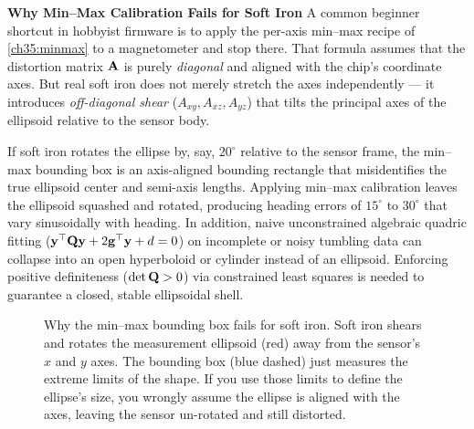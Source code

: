 \begin{trapbox}
\textbf{Why Min--Max Calibration Fails for Soft Iron}
A common beginner shortcut in hobbyist firmware is to apply the per-axis min--max
recipe of \eqref{ch35:minmax} to a magnetometer and stop there. That formula assumes that the distortion matrix $\mathbf{A}$ is purely \emph{diagonal} and aligned with the chip's coordinate axes. But real soft iron does not merely stretch the axes independently --- it introduces \emph{off-diagonal shear} ($A_{xy}, A_{xz}, A_{yz}$) that tilts the principal axes of the ellipsoid relative to the sensor body.

If soft iron rotates the ellipse by, say, $20^\circ$ relative to the sensor frame, the min--max bounding box is an axis-aligned bounding rectangle that misidentifies the true ellipsoid center and semi-axis lengths. Applying min--max calibration leaves the ellipsoid squashed and rotated, producing heading errors of $15^\circ$ to $30^\circ$ that vary sinusoidally with heading. 
In addition, naive unconstrained algebraic quadric fitting ($\mathbf{y}^\top \mathbf{Q}\mathbf{y} + 2\mathbf{g}^\top\mathbf{y} + d = 0$) on incomplete or noisy tumbling data can collapse into an open hyperboloid or cylinder instead of an ellipsoid. Enforcing positive definiteness ($\det \mathbf{Q} > 0$) via constrained least squares is needed to guarantee a closed, stable ellipsoidal shell.
\end{trapbox}

\begin{figure}[H]
\centering
{}
\caption{Why the min--max bounding box fails for soft iron. Soft iron shears and rotates the measurement ellipsoid (red) away from the sensor's $x$ and $y$ axes. The bounding box (blue dashed) just measures the extreme limits of the shape. If you use those limits to define the ellipse's size, you wrongly assume the ellipse is aligned with the axes, leaving the sensor un-rotated and still distorted.}
\label{ch35:fig-minmax-fail}
\end{figure}

